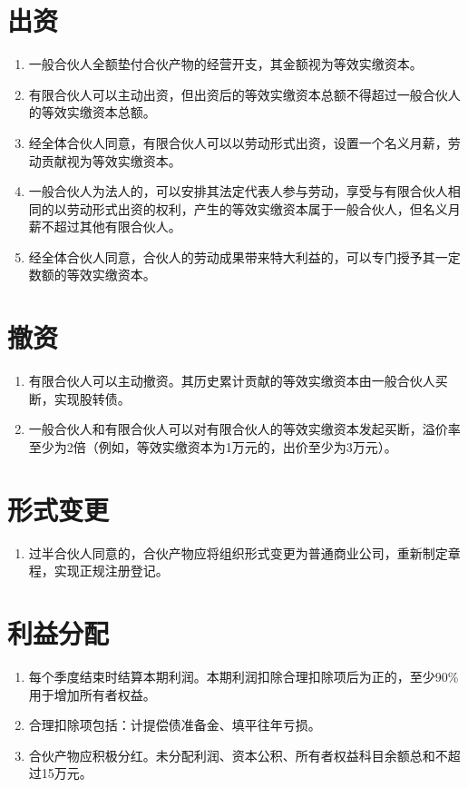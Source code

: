 \documentclass[a4paper,11pt]{article}
\begin{document}
\section{出资}
\begin{enumerate}
    \item 一般合伙人全额垫付合伙产物的经营开支，其金额视为等效实缴资本。
    \item 有限合伙人可以主动出资，但出资后的等效实缴资本总额不得超过一般合伙人的等效实缴资本总额。
    \item 经全体合伙人同意，有限合伙人可以以劳动形式出资，设置一个名义月薪，劳动贡献视为等效实缴资本。
    \item 一般合伙人为法人的，可以安排其法定代表人参与劳动，享受与有限合伙人相同的以劳动形式出资的权利，产生的等效实缴资本属于一般合伙人，但名义月薪不超过其他有限合伙人。
    \item 经全体合伙人同意，合伙人的劳动成果带来特大利益的，可以专门授予其一定数额的等效实缴资本。
\end{enumerate}



\section{撤资}
\begin{enumerate}
    \item 有限合伙人可以主动撤资。其历史累计贡献的等效实缴资本由一般合伙人买断，实现股转债。
    \item 一般合伙人和有限合伙人可以对有限合伙人的等效实缴资本发起买断，溢价率至少为2倍（例如，等效实缴资本为1万元的，出价至少为3万元）。
\end{enumerate}



\section{形式变更}
\begin{enumerate}
    \item 过半合伙人同意的，合伙产物应将组织形式变更为普通商业公司，重新制定章程，实现正规注册登记。
\end{enumerate}



\section{利益分配}
\begin{enumerate}
    \item 每个季度结束时结算本期利润。本期利润扣除合理扣除项后为正的，至少90\%用于增加所有者权益。
    \item 合理扣除项包括：计提偿债准备金、填平往年亏损。
    \item 合伙产物应积极分红。未分配利润、资本公积、所有者权益科目余额总和不超过15万元。
\end{enumerate}
\end{document}
